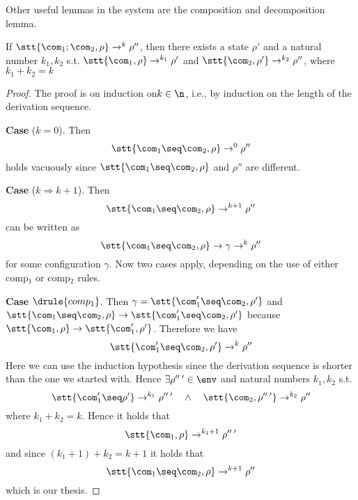 \noindent
Other useful lemmas in the system are the composition and
decomposition lemma.

\begin{lemma}\label{le:decomp}
  If \(\stt{\com_1;\com_2, \rho} \to^k \rho''\), then there exists a
  state \(\rho'\) and a natural number \(k_1, k_2\)
  s.t. \(\stt{\com_1, \rho} \to^{k_1} \rho'\) and
  \(\stt{\com_2, \rho'} \to^{k_2}\rho''\), where \(k_1 + k_2 = k\)
\end{lemma}

\begin{proof}
  The proof is on induction on\(k\in\n\), i.e., by induction on the
  length of the derivation sequence.

  \medskip

  \noindent
  \textbf{Case} (\(k = 0\)).  Then
  \begin{equation*}
    \stt{\com_1\seq\com_2, \rho} \to^0 \rho''
  \end{equation*}
  holds vacuously since \(\stt{\com_1\seq\com_2, \rho}\) and
  \(\rho''\) are different.

  \medskip

  \noindent
  \textbf{Case} (\(k \Rightarrow k+1\)). Then
  \begin{equation*}
    \stt{\com_1\seq\com_2, \rho} \to^{k+1} \rho''
  \end{equation*}
  can be written as
  \begin{equation*}
    \stt{\com_1\seq\com_2, \rho} \to \gamma \to^{k} \rho''
  \end{equation*}
  for some configuration \(\gamma\). Now two cases apply, depending on
  the use of either comp\(_1\) or comp\(_2\) rules.

  \medskip

  \textbf{Case} \(\drule{comp_1}\).  Then
  \({\gamma = \stt{\com_1'\seq\com_2, \rho'}}\) and
  \({\stt{\com_1\seq\com_2, \rho} \to \stt{\com_1'\seq\com_2,
      \rho'}}\) because
  \({\stt{\com_1, \rho}\to\stt{\com_1', \rho'}}\). Therefore we have
  \begin{equation*}
    \stt{\com_1'\seq\com_2, \rho'} \to^k \rho''
  \end{equation*}
  Here we can use the induction hypothesis since the derivation
  sequence is shorter than the one we started with. Hence
  \(\exists \rho''\,' \in \env\) and natural numbers \(k_1, k_2\) s.t.
  \begin{equation*}
    \stt{\com_1'\seq\rho'}\to^{k_1}\rho''\,' \quad \wedge \quad \stt{\com_2, \rho''\,'} \to^{k_2} \rho''
  \end{equation*}
  where \(k_1 + k_2 = k\). Hence it holds that
  \begin{equation*}
    \stt{\com_1, \rho} \to^{k_1+1} \rho''\,'
  \end{equation*}
  and since \((k_1 + 1) + k_2 = k + 1\) it holds that
  \begin{equation*}
    \stt{\com_1\seq\com_2, \rho} \to^{k+1} \rho''
  \end{equation*}
  which is our thesis.


\end{proof}
